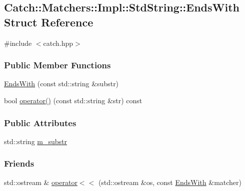\hypertarget{structCatch_1_1Matchers_1_1Impl_1_1StdString_1_1EndsWith}{\subsection{Catch\-:\-:Matchers\-:\-:Impl\-:\-:Std\-String\-:\-:Ends\-With Struct Reference}
\label{structCatch_1_1Matchers_1_1Impl_1_1StdString_1_1EndsWith}
}


{\ttfamily \#include $<$catch.\-hpp$>$}

\subsubsection*{Public Member Functions}
\begin{DoxyCompactItemize}
\item 
\hyperlink{structCatch_1_1Matchers_1_1Impl_1_1StdString_1_1EndsWith_ae8b4302029094a6486656b2d800e5e1f}{Ends\-With} (const std\-::string \&substr)
\item 
bool \hyperlink{structCatch_1_1Matchers_1_1Impl_1_1StdString_1_1EndsWith_a8baf52ce3d1693940244f496c64c119d}{operator()} (const std\-::string \&str) const 
\end{DoxyCompactItemize}
\subsubsection*{Public Attributes}
\begin{DoxyCompactItemize}
\item 
std\-::string \hyperlink{structCatch_1_1Matchers_1_1Impl_1_1StdString_1_1EndsWith_a5abf70e94ea7893b7bd1e7b33880ba7b}{m\-\_\-substr}
\end{DoxyCompactItemize}
\subsubsection*{Friends}
\begin{DoxyCompactItemize}
\item 
std\-::ostream \& \hyperlink{structCatch_1_1Matchers_1_1Impl_1_1StdString_1_1EndsWith_a3389586caac8a112f2413ecc3d155131}{operator$<$$<$} (std\-::ostream \&os, const \hyperlink{structCatch_1_1Matchers_1_1Impl_1_1StdString_1_1EndsWith}{Ends\-With} \&matcher)
\end{DoxyCompactItemize}


